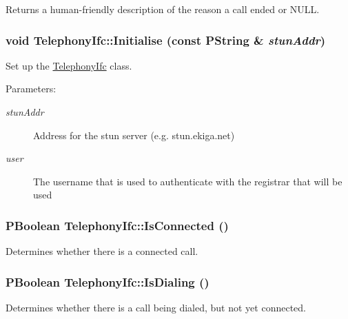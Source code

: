 Returns a human-friendly description of the reason a call ended or NULL. 

\hypertarget{classTelephonyIfc_b63974908141d9dd111af91617276735}{
\subsubsection[{Initialise}]{\setlength{\rightskip}{0pt plus 5cm}void TelephonyIfc::Initialise (const PString \& {\em stunAddr})}}
\label{classTelephonyIfc_b63974908141d9dd111af91617276735}


Set up the \hyperlink{classTelephonyIfc}{TelephonyIfc} class. 

\begin{Desc}
\item[Parameters:]
\begin{description}
\item[{\em stunAddr}]Address for the stun server (e.g. stun.ekiga.net) \item[{\em user}]The username that is used to authenticate with the registrar that will be used \end{description}
\end{Desc}
\hypertarget{classTelephonyIfc_2a68749063e9e0c45ac31e8e44fa0849}{
\subsubsection[{IsConnected}]{\setlength{\rightskip}{0pt plus 5cm}PBoolean TelephonyIfc::IsConnected ()}}
\label{classTelephonyIfc_2a68749063e9e0c45ac31e8e44fa0849}


Determines whether there is a connected call. 

\hypertarget{classTelephonyIfc_074e1d67c95ce1e66d346bb7315d5dcd}{
\subsubsection[{IsDialing}]{\setlength{\rightskip}{0pt plus 5cm}PBoolean TelephonyIfc::IsDialing ()}}
\label{classTelephonyIfc_074e1d67c95ce1e66d346bb7315d5dcd}


Determines whether there is a call being dialed, but not yet connected. 

